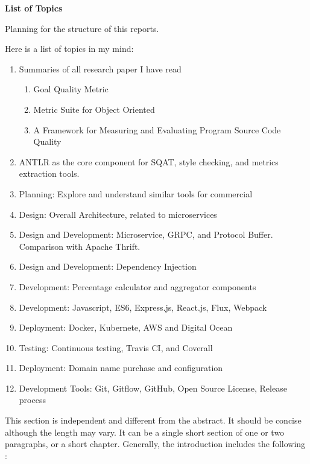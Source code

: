 \newpage
\textbf{List of Topics}

Planning for the structure of this reports.

\par \noindent Here is a list of topics in my mind:

\begin{enumerate}
    \item Summaries of all research paper I have read
    \begin{enumerate}
        \item Goal Quality Metric
        \item Metric Suite for Object Oriented
        \item A Framework for Measuring and Evaluating Program Source Code Quality
    \end{enumerate}
    
    \item ANTLR as the core component for SQAT, style checking, and metrics extraction tools.
    
    \item Planning: Explore and understand similar tools for commercial
    
    \item Design: Overall Architecture, related to microservices
    \item Design and Development: Microservice, GRPC, and Protocol Buffer. Comparison with Apache Thrift. 
    \item Design and Development: Dependency Injection
    
    \item Development: Percentage calculator and aggregator components
    \item Development: Javascript, ES6, Express.js, React.js, Flux, Webpack
     \item Deployment: Docker, Kubernete, AWS and Digital Ocean
    
    \item Testing: Continuous testing, Travis CI, and Coverall
    
    \item Deployment: Domain name purchase and configuration
    
    \item Development Tools: Git, Gitflow, GitHub, Open Source License, Release process
    
\end{enumerate}


This section is independent and different from the \cite[]{einstein} abstract. It should be concise although the length \citet{knuth-fa} may vary. It can be a single short section of one or \citep{knuthwebsite} two paragraphs, or a short chapter. Generally, the introduction includes \citeauthor{einstein} the following \citeyear{dirac}:

